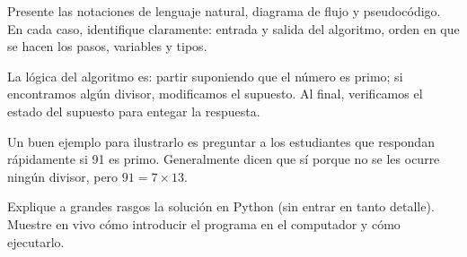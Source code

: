 \documentclass[10pt]{article}
\begin{document}
  Presente las notaciones de lenguaje natural,
  diagrama de flujo y pseudocódigo.
  En cada caso, identifique claramente:
  entrada y salida del algoritmo,
  orden en que se hacen los pasos,
  variables y tipos.

  La lógica del algoritmo es:
  partir suponiendo que el número es primo;
  si encontramos algún divisor,
  modificamos el supuesto.
  Al final, verificamos el estado del supuesto
  para entegar la respuesta.

  Un buen ejemplo para ilustrarlo
  es preguntar a los estudiantes que respondan rápidamente si 91 es primo.
  Generalmente dicen que sí porque no se les ocurre ningún divisor,
  pero \(91 = 7\times 13\).


  Explique a grandes rasgos la solución en Python
  (sin entrar en tanto detalle).
  Muestre en vivo
  cómo introducir el programa en el computador
  y cómo ejecutarlo.
\end{document}
